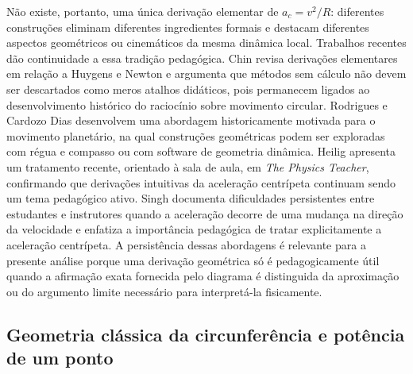 \documentclass[12pt,a4paper]{article}
\numberwithin{equation}{section}
\theoremstyle{remark}
\begin{document}
Não existe, portanto, uma única derivação elementar de $a_c=v^2/R$: diferentes construções eliminam diferentes ingredientes formais e destacam diferentes aspectos geométricos ou cinemáticos da mesma dinâmica local. Trabalhos recentes dão continuidade a essa tradição pedagógica. Chin \cite{chin2022elementary} revisa derivações elementares em relação a Huygens e Newton e argumenta que métodos sem cálculo não devem ser descartados como meros atalhos didáticos, pois permanecem ligados ao desenvolvimento histórico do raciocínio sobre movimento circular. Rodrigues e Cardozo Dias \cite{rodrigues2022planetary} desenvolvem uma abordagem historicamente motivada para o movimento planetário, na qual construções geométricas podem ser exploradas com régua e compasso ou com software de geometria dinâmica. Heilig \cite{heilig2026intuitive} apresenta um tratamento recente, orientado à sala de aula, em \textit{The Physics Teacher}, confirmando que derivações intuitivas da aceleração centrípeta continuam sendo um tema pedagógico ativo. Singh \cite{singh2009centripetal} documenta dificuldades persistentes entre estudantes e instrutores quando a aceleração decorre de uma mudança na direção da velocidade e enfatiza a importância pedagógica de tratar explicitamente a aceleração centrípeta. A persistência dessas abordagens é relevante para a presente análise porque uma derivação geométrica só é pedagogicamente útil quando a afirmação exata fornecida pelo diagrama é distinguida da aproximação ou do argumento limite necessário para interpretá-la fisicamente.

\subsection{Geometria clássica da circunferência e potência de um ponto}
\end{document}
